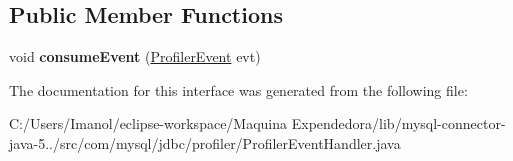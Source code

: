 \subsection*{Public Member Functions}
\begin{DoxyCompactItemize}
\item 
\mbox{\label{interfacecom_1_1mysql_1_1jdbc_1_1profiler_1_1_profiler_event_handler_ab9131d7f6ddf57c7ab3443d40272708b}} 
void {\bfseries consume\+Event} (\mbox{\hyperlink{classcom_1_1mysql_1_1jdbc_1_1profiler_1_1_profiler_event}{Profiler\+Event}} evt)
\end{DoxyCompactItemize}


The documentation for this interface was generated from the following file\+:\begin{DoxyCompactItemize}
\item 
C\+:/\+Users/\+Imanol/eclipse-\/workspace/\+Maquina Expendedora/lib/mysql-\/connector-\/java-\/5../src/com/mysql/jdbc/profiler/Profiler\+Event\+Handler.\+java\end{DoxyCompactItemize}
